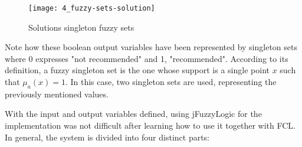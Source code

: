 	\begin{figure}
		\centering
		\texttt{[image: 4\_fuzzy-sets-solution]}
		\caption[Solutions singleton fuzzy sets]{Solutions singleton fuzzy sets}
		\label{fig:fs-solution}
	\end{figure}

Note how these boolean output variables have been represented by singleton sets where 0 expresses  "not recommended" and 1, "recommended". According to its definition, a fuzzy singleton set is the one whose support is a single point $x$ such that $\mu_a(x) = 1$. In this case, two singleton sets are used, representing the previously mentioned values.

With the input and output variables defined, using jFuzzyLogic for the implementation was not difficult after learning how to use it together with FCL. In general, the system is divided into four distinct parts:

